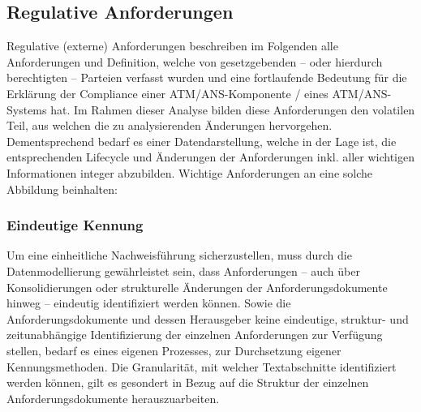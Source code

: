 \subsection{Regulative Anforderungen}\label{model_anforderungen}


Regulative (externe) Anforderungen beschreiben im Folgenden alle Anforderungen und Definition, welche von gesetzgebenden -- oder hierdurch berechtigten -- Parteien verfasst wurden und eine fortlaufende Bedeutung für die Erklärung der Compliance einer ATM/ANS-Komponente / eines ATM/ANS-Systems hat.   
Im Rahmen dieser Analyse bilden diese Anforderungen den volatilen Teil, aus welchen die zu analysierenden Änderungen hervorgehen.
Dementsprechend bedarf es einer Datendarstellung, welche in der Lage ist, die entsprechenden Lifecycle und Änderungen der Anforderungen inkl. aller wichtigen Informationen integer abzubilden.   
Wichtige Anforderungen an eine solche Abbildung beinhalten:

\subsubsection{Eindeutige Kennung}

    Um eine einheitliche Nachweisführung sicherzustellen, muss durch die Datenmodellierung gewährleistet sein, dass Anforderungen -- auch über Konsolidierungen oder strukturelle Änderungen der Anforderungsdokumente hinweg -- eindeutig identifiziert werden können.
    Sowie die Anforderungsdokumente und dessen Herausgeber keine eindeutige, struktur- und zeitunabhängige Identifizierung der  einzelnen Anforderungen zur Verfügung stellen, bedarf es eines eigenen Prozesses, zur Durchsetzung eigener Kennungsmethoden.  
Die Granularität, mit welcher Textabschnitte identifiziert werden können, gilt es gesondert in Bezug auf die Struktur der einzelnen Anforderungsdokumente herauszuarbeiten.

